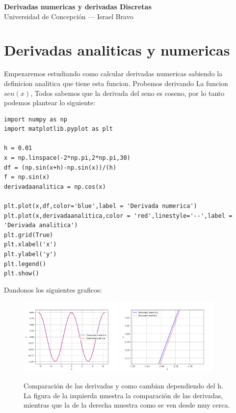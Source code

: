 \documentclass[11pt,a4paper]{article}
\begin{document}
\begin{center}
    {\LARGE \textbf{Derivadas numericas y derivadas Discretas}}\\[4pt]
    {\large Universidad de Concepción — Israel Bravo}\\[10pt]
    \hrulefill
\end{center}

\section{Derivadas analiticas y numericas}
Empezaremos estudiando como calcular derivadas numericas sabiendo la definicion analitica
que tiene esta funcion. Probemos derivando La funcion $sen(x)$, Todos sabemos que la derivada
del seno es coseno, por lo tanto podemos plantear lo siguiente:

\begin{lstlisting}[caption=Derivar seno numericamente]
import numpy as np
import matplotlib.pyplot as plt

h = 0.01
x = np.linspace(-2*np.pi,2*np.pi,30)
df = (np.sin(x+h)-np.sin(x))/(h)
f = np.sin(x)
derivadaanalitica = np.cos(x)

plt.plot(x,df,color='blue',label = 'Derivada numerica')
plt.plot(x,derivadaanalitica,color = 'red',linestyle='--',label = 'Derivada analitica')
plt.grid(True)
plt.xlabel('x')
plt.ylabel('y')
plt.legend()
plt.show()

\end{lstlisting}
Dandonos los siguientes graficos:

\begin{figure}[h!]
    \centering
    \includegraphics[width=0.45\textwidth]{img/derivadascomparadas.png}
    \hfill %
    \includegraphics[width=0.45\textwidth]{img/derivadascomparadaserror.png}
    \caption{Comparación de las derivadas y como cambian dependiendo del h. La figura de la izquierda muestra la comparación de las derivadas, mientras que la de la derecha muestra como se ven desde muy cerca.}
    \label{fig:derivadas_comparadas}
\end{figure}
\end{document}

